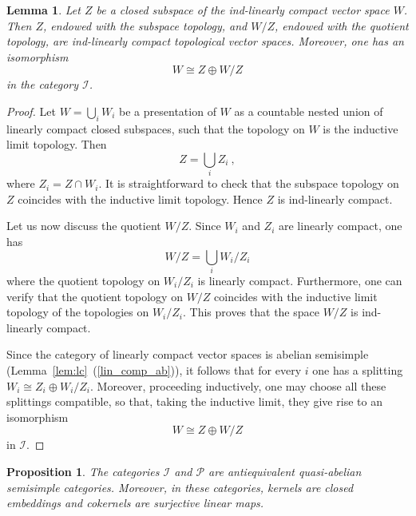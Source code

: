 \documentclass[12pt,reqno]{amsart}
\newtheorem{lem}[thm]{Lemma}
\newtheorem{prop}[thm]{Proposition}
\theoremstyle{definition}
\theoremstyle{remark}
\begin{document}
	\begin{lem}\label{lem:ind-linsubquot}
	        Let $Z$ be a closed subspace of the ind-linearly compact vector space $W$. Then $Z$, endowed with the subspace topology, and $W/Z$, endowed with the quotient topology, are ind-linearly compact topological vector spaces. Moreover, one has an isomorphism 
	        $$W\cong Z\oplus W/Z$$ 
	        in the category $\mathcal{I}$.
	\end{lem}
	\begin{proof}
	    Let $W = \bigcup_i W_i$ be a presentation of $W$ as a countable nested union of linearly compact closed subspaces, such that the topology on $W$ is the inductive limit topology. Then
	    $$
	    Z = \bigcup_i Z_i \ ,
	    $$
	    where $Z_i = Z \cap W_i$. It is straightforward to check that the subspace topology on $Z$ coincides with the inductive limit topology. Hence $Z$ is ind-linearly compact.
	    
	    Let us now discuss the quotient $W/Z$. Since $W_i$ and $Z_i$ are linearly compact, one has
	    $$
	    W/Z = \bigcup_i W_i / Z_i
	    $$
	    where the quotient topology on $W_i/Z_i$ is linearly compact. Furthermore, one can verify that the quotient topology on $W/Z$ coincides with the inductive limit topology of the topologies on $W_i / Z_i$. This proves that the space $W/Z$ is ind-linearly compact.
	    
	   Since the category of linearly compact vector spaces is abelian semisimple (Lemma~\ref{lem:lc}~(\ref{lin_comp_ab})), it follows that for every $i$ one has a splitting $W_i \cong Z_i \oplus W_i/Z_i$. Moreover, proceeding inductively, one may choose all these splittings compatible, so that, taking the inductive limit, they give rise to an isomorphism
	   $$
	   W \cong Z\oplus W/Z
	   $$
	   in $\mathcal{I}$.
	\end{proof}
	
	\begin{prop}\label{prop:quasiab}
	    The categories $\mathcal{I}$ and $\mathcal{P}$ are antiequivalent quasi-abelian semisimple categories. Moreover, in these categories, kernels are closed embeddings and cokernels are surjective linear maps.
	\end{prop}
	
\end{document}
